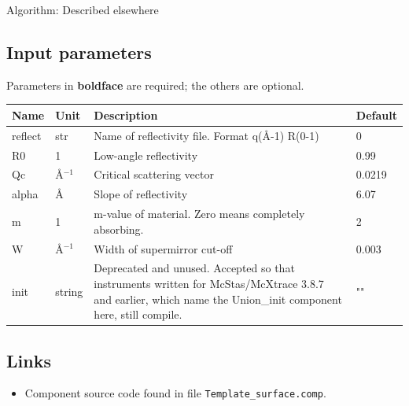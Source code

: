 Algorithm: Described elsewhere

\subsection*{Input parameters}
Parameters in \textbf{boldface} are required; the others are optional.

\begin{longtable}{p{}p{}p{}p{}}
\toprule
\textbf{Name} & \textbf{Unit} & \textbf{Description} & \textbf{Default} \\
\midrule
\endhead
reflect & str & Name of reflectivity file. Format q(\AA{}-1) R(0-1) & 0 \\
R0 & 1 & Low-angle reflectivity & 0.99 \\
Qc & \AA{}$^{-1}$ & Critical scattering vector & 0.0219 \\
alpha & \AA{} & Slope of reflectivity & 6.07 \\
m & 1 & m-value of material. Zero means completely absorbing. & 2 \\
W & \AA{}$^{-1}$ & Width of supermirror cut-off & 0.003 \\
init & string & Deprecated and unused. Accepted so that instruments written for McStas/McXtrace 3.8.7 and earlier, which name the Union\_init component here, still compile. & "" \\
\bottomrule
\end{longtable}

\subsection*{Links}
\begin{itemize}
  \item Component source code found in file \texttt{Template\_surface.comp}.
\end{itemize}
